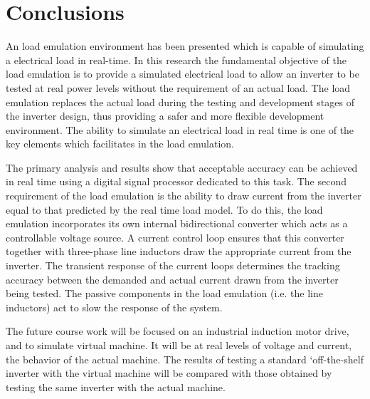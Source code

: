 \chapter{Conclusions}
An load emulation environment has been presented which is capable of simulating a electrical load in real-time. In this research the fundamental objective of the load emulation is to
provide a simulated electrical load to allow an inverter
to be tested at real power levels without the requirement of an actual load. 
The load emulation replaces the actual load during the testing and
development stages of the inverter design, thus providing a safer and more flexible development environment.
The ability to simulate an electrical load in real
time is one of the key elements which facilitates in the load emulation. \par
The primary analysis and results show that acceptable accuracy can be achieved in real time using a digital signal processor dedicated to this task.
The second requirement of the load emulation is the
ability to draw current from the inverter equal to that
predicted by the real time load model. To do this, the
load emulation incorporates its own internal bidirectional converter which acts as a controllable voltage
source. A current control loop ensures that this converter together with three-phase line inductors draw the
appropriate current from the inverter. The transient
response of the current loops determines the tracking
accuracy between the demanded and actual current
drawn from the inverter being tested. The passive components in the load emulation (i.e. the line inductors) act
to slow the response of the system.\par
The future course work will be focused on an industrial
induction motor drive, and to simulate virtual machine. It will be at real levels of voltage and current, the behavior of the actual machine. The results of testing a standard `off-the-shelf inverter with the virtual machine will be compared with those
obtained by testing the same inverter with the actual
machine.
